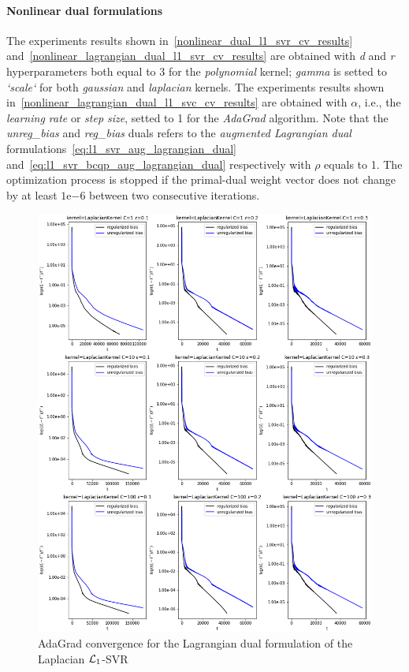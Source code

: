 \paragraph{Nonlinear dual formulations}

The experiments results shown in~\ref{nonlinear_dual_l1_svr_cv_results} and~\ref{nonlinear_lagrangian_dual_l1_svr_cv_results} are obtained with \emph{d} and \emph{r} hyperparameters both equal to 3 for the \emph{polynomial} kernel; \emph{gamma} is setted to \emph{`scale`} for both \emph{gaussian} and \emph{laplacian} kernels. The experiments results shown in~\ref{nonlinear_lagrangian_dual_l1_svc_cv_results} are obtained with $\alpha$, i.e., the \emph{learning rate} or \emph{step size}, setted to 1 for the \emph{AdaGrad} algorithm. Note that the \emph{unreg\_bias} and \emph{reg\_bias} duals refers to the \emph{augmented Lagrangian dual} formulations~\eqref{eq:l1_svr_aug_lagrangian_dual} and~\eqref{eq:l1_svr_bcqp_aug_lagrangian_dual} respectively with $\rho$ equals to 1. The optimization process is stopped if the primal-dual weight vector does not change by at least $1\mathrm{e}{-6}$  between two consecutive iterations.





\begin{figure}[H]
	\centering
	\includegraphics[scale=0.55]{img/laplacian_lagrangian_dual_l1_svr_loss_history}
	\caption{AdaGrad convergence for the Lagrangian dual formulation of the Laplacian $\protect \mathcal{L}_1$-SVR}
	\label{fig:laplacian_lagrangian_dual_l1_svr_loss_history}
\end{figure}

